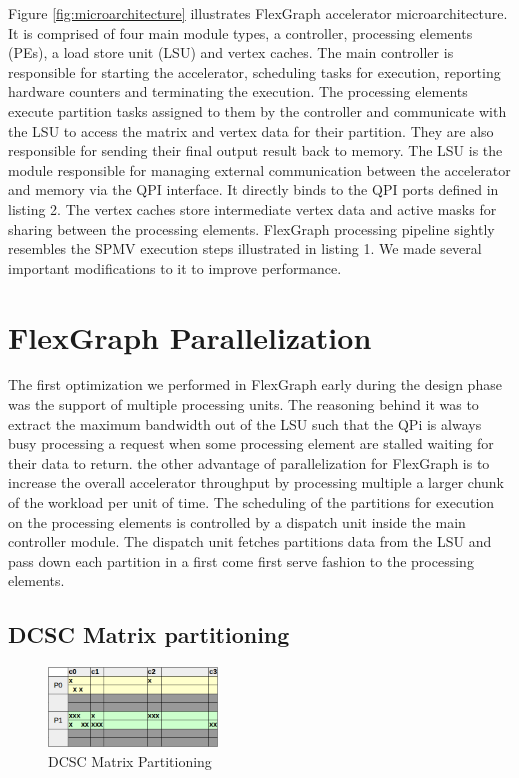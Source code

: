 Figure \ref{fig:microarchitecture} illustrates FlexGraph accelerator microarchitecture. It is comprised of four main module types, a controller, processing elements (PEs), a load store unit (LSU) and vertex caches. The main controller is responsible for starting the accelerator, scheduling tasks for execution, reporting hardware counters and terminating the execution. The processing elements execute partition tasks assigned to them by the controller and communicate with the LSU to access the matrix and vertex data for their partition. They are also responsible for sending their final output result back to memory. The LSU is the module responsible for managing external communication between the accelerator and memory via the QPI interface. It directly binds to the QPI ports defined in listing 2.
The vertex caches store intermediate vertex data and active masks for sharing between the processing elements. FlexGraph processing pipeline sightly resembles the SPMV execution steps illustrated in listing 1. We made several important modifications to it to improve performance.  

\section{FlexGraph Parallelization}

The first optimization we performed in FlexGraph early during the design phase was the support of multiple processing units. The reasoning behind it was to extract the maximum bandwidth out of the LSU such that the QPi is always busy processing a request when some processing element are stalled waiting for their data to return. the other advantage of parallelization for FlexGraph is to increase the overall accelerator throughput by processing multiple a larger chunk of the workload per unit of time. The scheduling of the partitions for execution on the processing elements is controlled by a dispatch unit inside the main controller module. The dispatch unit fetches partitions data from the LSU and pass down each partition in a first come first serve fashion to the processing elements.

\subsection{DCSC Matrix partitioning}

\begin{figure}[htbp]
\centering
\includegraphics[width=0.4\textwidth]{figures/matrix_partitioning}
\caption{DCSC Matrix Partitioning}
\label{fig:matrix_partitioning}
\end{figure}

